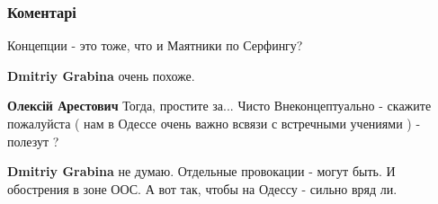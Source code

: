  
 
 
 
 
\subsubsection{Коментарі}
\label{sec:09_08_2021.fb.arestovich_alexei.1.myshlenie_chelovek.cmt}

\begin{itemize}
 
Концепции - это тоже, что и Маятники по Серфингу?

\begin{itemize}
 
\textbf{Dmitriy Grabina} очень похоже.

 
\textbf{Олексій Арестович}
Тогда, простите за... Чисто Внеконцептуально - скажите пожалуйста ( нам в
Одессе очень важно всвязи с встречными учениями ) - полезут ?



 
\textbf{Dmitriy Grabina} не думаю. Отдельные провокации - могут быть.
И обострения в зоне ООС.
А вот так, чтобы на Одессу - сильно вряд ли.


\end{itemize}
\end{itemize}
